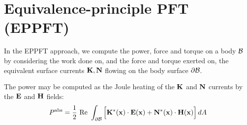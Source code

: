 \newpage
\section{Equivalence-principle PFT (EPPFT)}

In the EPPFT approach, we compute the power, force and torque
on a body $\mathcal{B}$ by considering the work done on, and the force and
torque exerted on, the equivalent surface currents $\mathbf{K}, \mathbf{N}$
flowing on the body surface $\partial \mathcal{B}$.

The power may be computed as the Joule heating of the
$\mathbf{K}$ and $\mathbf{N}$ currents by the $\mathbf{E}$ and $\mathbf{H}$ fields:
\begin{subequations}
\begin{equation}
 P^{\hbox{\scriptsize{abs}}} 
     = \frac{1}{2}\text{ Re }
      \int_{\partial \mathcal{B}} \Big[ \mathbf{K}^*(\mathbf{x}) \cdot \mathbf{E}(\mathbf{x})
                                 +\mathbf{N}^*(\mathbf{x}) \cdot \mathbf{H}(\mathbf{x})
                            \Big] \, dA
\end{equation}
\end{subequations}

